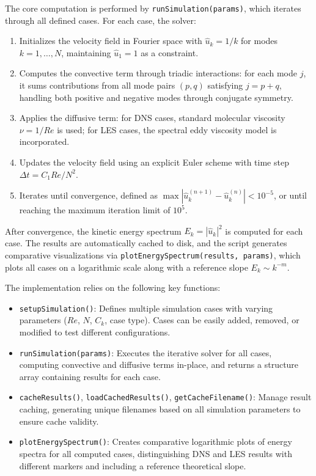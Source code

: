 The core computation is performed by \texttt{runSimulation(params)}, which iterates through all defined cases. For each case, the solver:
\begin{enumerate}
\item Initializes the velocity field in Fourier space with $\hat{u}_k = 1/k$ for modes $k = 1, \ldots, N$, maintaining $\hat{u}_1 = 1$ as a constraint.
\item Computes the convective term through triadic interactions: for each mode $j$, it sums contributions from all mode pairs $(p,q)$ satisfying $j = p + q$, handling both positive and negative modes through conjugate symmetry.
\item Applies the diffusive term: for DNS cases, standard molecular viscosity $\nu = 1/Re$ is used; for LES cases, the spectral eddy viscosity model is incorporated.
\item Updates the velocity field using an explicit Euler scheme with time step $\Delta t = C_1 Re/N^2$.
\item Iterates until convergence, defined as $\max|\hat{u}_k^{(n+1)} - \hat{u}_k^{(n)}| < 10^{-5}$, or until reaching the maximum iteration limit of $10^5$.
\end{enumerate}

After convergence, the kinetic energy spectrum $E_k = |\hat{u}_k|^2$ is computed for each case. The results are automatically cached to disk, and the script generates comparative visualizations via \texttt{plotEnergySpectrum(results, params)}, which plots all cases on a logarithmic scale along with a reference slope $E_k \sim k^{-m}$.

The implementation relies on the following key functions:
\begin{itemize}
\item \texttt{setupSimulation()}: Defines multiple simulation cases with varying parameters ($Re$, $N$, $C_k$, case type). Cases can be easily added, removed, or modified to test different configurations.
\item \texttt{runSimulation(params)}: Executes the iterative solver for all cases, computing convective and diffusive terms in-place, and returns a structure array containing results for each case.
\item \texttt{cacheResults()}, \texttt{loadCachedResults()}, \texttt{getCacheFilename()}: Manage result caching, generating unique filenames based on all simulation parameters to ensure cache validity.
\item \texttt{plotEnergySpectrum()}: Creates comparative logarithmic plots of energy spectra for all computed cases, distinguishing DNS and LES results with different markers and including a reference theoretical slope.
\end{itemize}


